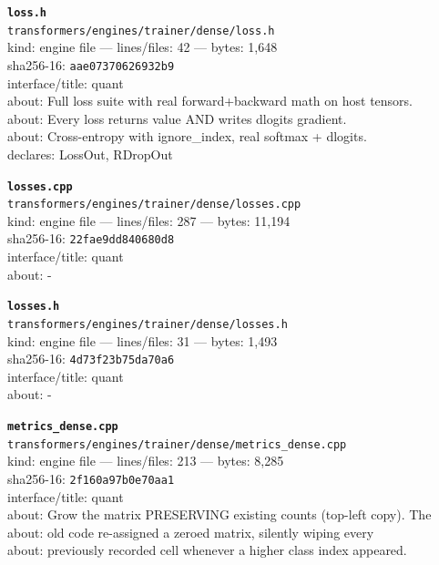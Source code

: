 \noindent\textbf{\texttt{loss.h}}\\
\texttt{transformers/engines/trainer/dense/loss.h}\\
kind: engine file --- lines/files: 42 --- bytes: 1,648\\
sha256-16: \texttt{aae07370626932b9}\\
interface/title: quant\\
about: Full loss suite with real forward+backward math on host tensors.\\
about: Every loss returns value AND writes dlogits gradient.\\
about: Cross-entropy with ignore\_index, real softmax + dlogits.\\
declares: LossOut, RDropOut\\
\vspace*{6.0pt}
\newpage

\noindent\textbf{\texttt{losses.cpp}}\\
\texttt{transformers/engines/trainer/dense/losses.cpp}\\
kind: engine file --- lines/files: 287 --- bytes: 11,194\\
sha256-16: \texttt{22fae9dd840680d8}\\
interface/title: quant\\
about: -\\
\vspace*{6.0pt}

\noindent\textbf{\texttt{losses.h}}\\
\texttt{transformers/engines/trainer/dense/losses.h}\\
kind: engine file --- lines/files: 31 --- bytes: 1,493\\
sha256-16: \texttt{4d73f23b75da70a6}\\
interface/title: quant\\
about: -\\
\vspace*{6.0pt}

\noindent\textbf{\texttt{metrics\_dense.cpp}}\\
\texttt{transformers/engines/trainer/dense/metrics\_dense.cpp}\\
kind: engine file --- lines/files: 213 --- bytes: 8,285\\
sha256-16: \texttt{2f160a97b0e70aa1}\\
interface/title: quant\\
about: Grow the matrix PRESERVING existing counts (top-left copy). The\\
about: old code re-assigned a zeroed matrix, silently wiping every\\
about: previously recorded cell whenever a higher class index appeared.\\
\vspace*{6.0pt}

